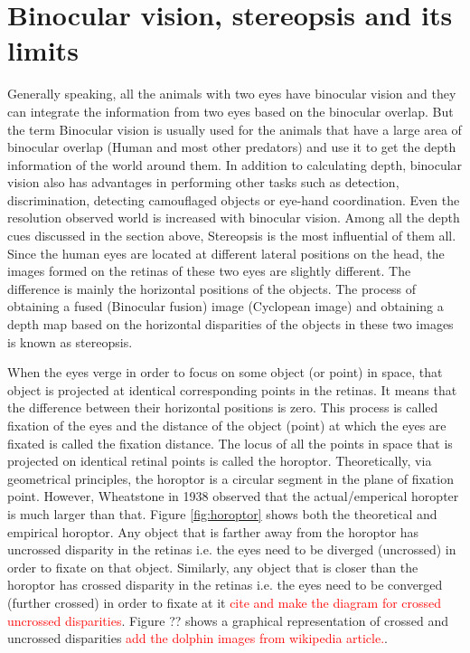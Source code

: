 \section{Binocular vision, stereopsis and its limits}
Generally speaking, all the animals with two eyes have binocular vision and they can integrate the information from two eyes based on the binocular overlap. But the term Binocular vision is usually used for the animals that have a large area of binocular overlap (Human and most other predators) and use it to get the depth information of the world around them. In addition to calculating depth, binocular vision also has advantages in performing other tasks such as detection, discrimination, detecting camouflaged objects or eye-hand coordination. Even the resolution observed world is increased with binocular vision\cite{howard1995binocular}. Among all the depth cues discussed in the section above, Stereopsis is the most influential of them all. Since the human eyes are located at different lateral positions on the head, the images formed on the retinas of these two eyes are slightly different. The difference is mainly the horizontal positions of the objects\cite{ wiki:stereopsis}. The process of obtaining a fused (Binocular fusion) image (Cyclopean image) and obtaining a depth map based on the horizontal disparities of the objects in these two images is known as stereopsis.

When the eyes verge in order to focus on some object (or point) in space, that object is projected at identical corresponding points in the retinas. It means that the difference between their horizontal positions is zero. This process is called fixation of the eyes and the distance of the object (point) at which the eyes are fixated is called the fixation distance. The locus of all the points in space that is projected on identical retinal points is called the horoptor\cite{ wiki:horoptor}. Theoretically, via geometrical principles, the horoptor is a circular segment in the plane of fixation point. However, Wheatstone in 1938 observed that the actual/emperical horopter is much larger than that. Figure \ref{fig:horoptor} shows both the theoretical and empirical horoptor. Any object that is farther away from the horoptor has uncrossed disparity in the retinas i.e. the eyes need to be diverged (uncrossed) in order to fixate on that object. Similarly, any object that is closer than the horoptor has crossed disparity in the retinas i.e. the eyes need to be converged (further crossed) in order to fixate at it \textcolor{red}{cite and make the diagram for crossed uncrossed disparities}. Figure ?? shows a graphical representation of crossed and uncrossed disparities \textcolor{red}{add the dolphin images from wikipedia article.}.

